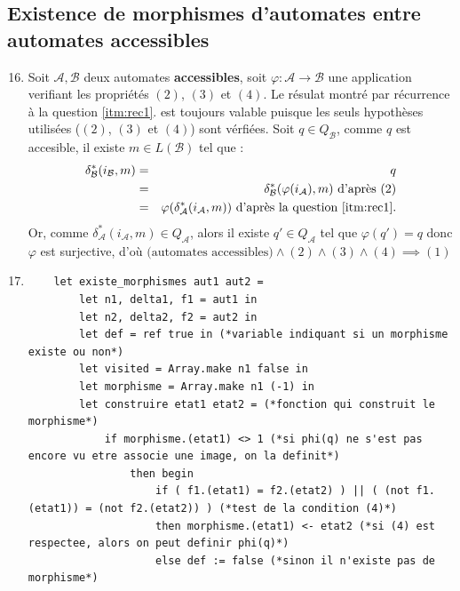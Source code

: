\documentclass{article}
\begin{document}
\subsection{Existence de morphismes d'automates entre automates accessibles}

\begin{enumerate}
    \setcounter{enumi}{15}
    
    \item \label{itm:16} Soit $\mathcal{A}, \mathcal{B}$ deux automates \textbf{accessibles}, soit $\varphi : \mathcal{A} \rightarrow \mathcal{B}$ une application verifiant les propriétés $(2)$, $(3)$ et $(4)$. Le résulat montré par récurrence à la question \ref{itm:rec1}. est toujours valable puisque les seuls hypothèses utilisées ($(2)$, $(3)$ et $(4)$) sont vérfiées. \newline
    Soit $q \in Q_\mathcal{B}$, comme $q$ est accesible, il existe $m \in L(\mathcal{B})$ tel que :
    \begin{eqnarray*}
        \delta^*_\mathcal{B}(i_\mathcal{B}, m) & = & q \\
        & = & \delta^*_\mathcal{B}(\varphi(i_\mathcal{A}), m) \text{ d'après $(2)$} \\
        & = & \varphi(\delta^*_\mathcal{A}(i_\mathcal{A}, m)) \text{ d'après la question \ref{itm:rec1}.}
    \end{eqnarray*}
    Or, comme $\delta^*_\mathcal{A}(i_\mathcal{A}, m) \in Q_\mathcal{A}$, alors il existe $q' \in Q_\mathcal{A}$ tel que $\varphi(q') = q$ donc $\varphi$ est surjective, d'où $\boxed{\text{(automates accessibles)} \land (2) \land (3) \land (4) \implies (1)}$
    \item  
    \begin{verbatim}
    let existe_morphismes aut1 aut2 =
        let n1, delta1, f1 = aut1 in 
        let n2, delta2, f2 = aut2 in
        let def = ref true in (*variable indiquant si un morphisme existe ou non*)
        let visited = Array.make n1 false in
        let morphisme = Array.make n1 (-1) in 
        let construire etat1 etat2 = (*fonction qui construit le morphisme*)
            if morphisme.(etat1) <> 1 (*si phi(q) ne s'est pas encore vu etre associe une image, on la definit*)
                then begin
                    if ( f1.(etat1) = f2.(etat2) ) || ( (not f1.(etat1)) = (not f2.(etat2)) ) (*test de la condition (4)*)
                    then morphisme.(etat1) <- etat2 (*si (4) est respectee, alors on peut definir phi(q)*)
                    else def := false (*sinon il n'existe pas de morphisme*)

\end{verbatim}
\end{enumerate}
\end{document}
